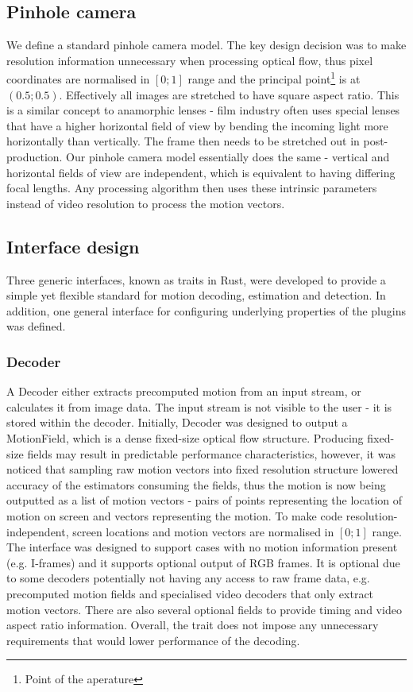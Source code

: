 \documentclass[11pt,english]{report}
\begin{document}
\subsection{Pinhole camera}

We define a standard pinhole camera model. The key design decision was to make resolution information unnecessary when processing optical flow, thus pixel coordinates are normalised in $[0; 1]$ range and the principal point\footnote{Point of the aperature} is at $(0.5; 0.5)$. Effectively all images are stretched to have square aspect ratio. This is a similar concept to anamorphic lenses - film industry often uses special lenses that have a higher horizontal field of view by bending the incoming light more horizontally than vertically. The frame then needs to be stretched out in post-production. Our pinhole camera model essentially does the same - vertical and horizontal fields of view are independent, which is equivalent to having differing focal lengths. Any processing algorithm then uses these intrinsic parameters instead of video resolution to process the motion vectors.

\subsection{Interface design}

Three generic interfaces, known as traits in Rust, were developed to provide a simple yet flexible standard for motion decoding, estimation and detection. In addition, one general interface for configuring underlying properties of the plugins was defined.

\subsubsection{Decoder}

A Decoder either extracts precomputed motion from an input stream, or calculates it from image data. The input stream is not visible to the user - it is stored within the decoder. Initially, Decoder was designed to output a MotionField, which is a dense fixed-size optical flow structure. Producing fixed-size fields may result in predictable performance characteristics, however, it was noticed that sampling raw motion vectors into fixed resolution structure lowered accuracy of the estimators consuming the fields, thus the motion is now being outputted as a list of motion vectors - pairs of points representing the location of motion on screen and vectors representing the motion. To make code resolution-independent, screen locations and motion vectors are normalised in $[0; 1]$ range. The interface was designed to support cases with no motion information present (e.g. I-frames) and it supports optional output of RGB frames. It is optional due to some decoders potentially not having any access to raw frame data, e.g. precomputed motion fields and specialised video decoders that only extract motion vectors. There are also several optional fields to provide timing and video aspect ratio information. Overall, the trait does not impose any unnecessary requirements that would lower performance of the decoding.
\end{document}
